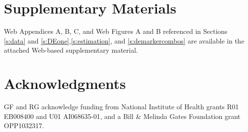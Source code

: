 \documentclass[useAMS,referee,usenatbib]{biom}
\begin{document}
\backmatter

\section*{Supplementary Materials}

Web Appendices A, B, C, and Web Figures A and B referenced in Sections \ref{s:data} and \ref{s:DEone},\ref{s:estimation},  and \ref{s:demarkercombos} are available in the attached Web-based supplementary material.\vspace*{-8pt}

\section*{Acknowledgments}
GF and RG acknowledge funding from National Institute of Health grants R01 EB008400 and U01 AI068635-01, and a Bill \& Melinda Gates Foundation grant OPP1032317. 

\end{document}

